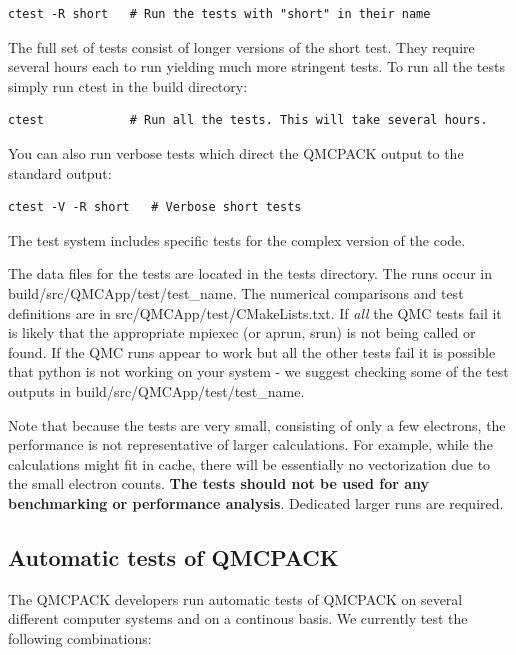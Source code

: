 \begin{verbatim}
ctest -R short   # Run the tests with "short" in their name
\end{verbatim}

The  full set of tests consist of longer versions of the short
test. They require several hours each to run yielding much more
stringent tests. To run all the tests simply run ctest in the build
directory:

\begin{verbatim}
ctest            # Run all the tests. This will take several hours.
\end{verbatim}

You can also run verbose tests which direct the QMCPACK
output to the standard output:
\begin{verbatim}
ctest -V -R short   # Verbose short tests
\end{verbatim}

The test system includes specific tests for the complex version of the code.

The data files for the tests are located in the tests directory. The
runs occur in build/src/QMCApp/test/test\_name. The numerical
comparisons and test definitions are in
src/QMCApp/test/CMakeLists.txt. If \textit{all} the QMC tests fail it is likely
that the appropriate mpiexec (or aprun, srun) is not being
called or found. If the QMC runs appear to work but all the other
tests fail it is possible that python is not working on your system -
we suggest checking some of the test outputs in build/src/QMCApp/test/test\_name.

Note that because the tests are very small, consisting of only a few
electrons, the performance is not representative of larger
calculations. For example, while the calculations might fit in cache,
there will be essentially no vectorization due to the small electron
counts. \textbf{The tests should not be used for any benchmarking or
performance analysis}. Dedicated larger runs are required.

\subsection{Automatic tests of QMCPACK}

The QMCPACK developers run automatic tests of QMCPACK on several
different computer systems and on a continous basis. We currently test
the following combinations:


